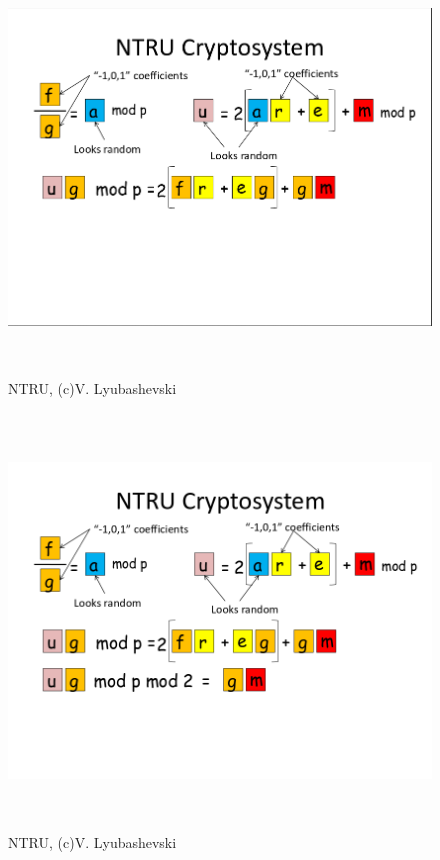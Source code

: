 \documentclass{beamer}
\begin{document}
\begin{frame}
    \begin{figure}
            \includegraphics[width=12cm,height=11cm,keepaspectratio]{img/vadim3.png}
            \caption{NTRU, (c)V. Lyubashevski}
        \end{figure}
\end{frame}

\begin{frame}
    \begin{figure}
            \includegraphics[width=12cm,height=11cm,keepaspectratio]{img/vadim4.png}
            \caption{NTRU, (c)V. Lyubashevski}
        \end{figure}
\end{frame}
\end{document}
